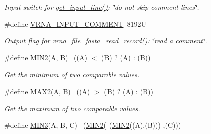 \begin{DoxyCompactItemize}
\begin{DoxyCompactList}\small\item\em Input switch for \hyperlink{group__utils_ga8ef1835eb83f542396f59f0b205965e5}{get\+\_\+input\+\_\+line()}\+: {\itshape \char`\"{}do not skip comment lines\char`\"{}}. \end{DoxyCompactList}\item 
\#define \hyperlink{group__utils_gaf2062e0eeefffd3ed639af460b3d4fab}{V\+R\+N\+A\+\_\+\+I\+N\+P\+U\+T\+\_\+\+C\+O\+M\+M\+E\+NT}~8192U\hypertarget{group__utils_gaf2062e0eeefffd3ed639af460b3d4fab}{}\label{group__utils_gaf2062e0eeefffd3ed639af460b3d4fab}

\begin{DoxyCompactList}\small\item\em Output flag for \hyperlink{group__file__utils_ga8cfb7e271efc9e1f34640acb85475639}{vrna\+\_\+file\+\_\+fasta\+\_\+read\+\_\+record()}\+: {\itshape \char`\"{}read a comment\char`\"{}}. \end{DoxyCompactList}\item 
\#define \hyperlink{group__utils_ga2dd4a927a7f937f43a90c144d79107d8}{M\+I\+N2}(A,  B)        ~((A) $<$ (B) ? (A) \+: (B))\hypertarget{group__utils_ga2dd4a927a7f937f43a90c144d79107d8}{}\label{group__utils_ga2dd4a927a7f937f43a90c144d79107d8}

\begin{DoxyCompactList}\small\item\em Get the minimum of two comparable values. \end{DoxyCompactList}\item 
\#define \hyperlink{group__utils_gadd91367918fadbc8d585940d6206d6d2}{M\+A\+X2}(A,  B)        ~((A) $>$ (B) ? (A) \+: (B))\hypertarget{group__utils_gadd91367918fadbc8d585940d6206d6d2}{}\label{group__utils_gadd91367918fadbc8d585940d6206d6d2}

\begin{DoxyCompactList}\small\item\em Get the maximum of two comparable values. \end{DoxyCompactList}\item 
\#define \hyperlink{group__utils_gafb23911b91805692382004ab5441f47c}{M\+I\+N3}(A,  B,  C)  ~(\hyperlink{group__utils_ga2dd4a927a7f937f43a90c144d79107d8}{M\+I\+N2}(  (\hyperlink{group__utils_ga2dd4a927a7f937f43a90c144d79107d8}{M\+I\+N2}((A),(B))) ,(C)))\hypertarget{group__utils_gafb23911b91805692382004ab5441f47c}{}\label{group__utils_gafb23911b91805692382004ab5441f47c}


\end{DoxyCompactItemize}
